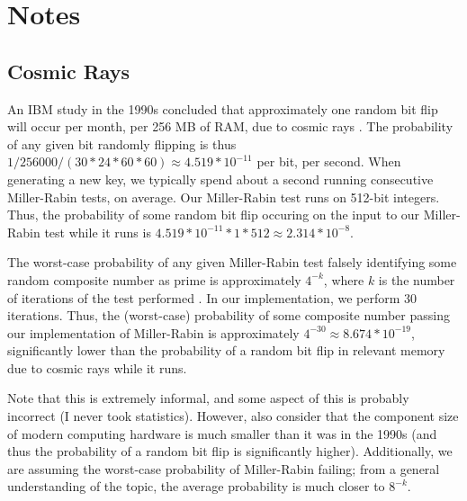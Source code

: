 \documentclass{article}
\begin{document}
\section{Notes}
\subsection{Cosmic Rays}
\label{sec:rays}
An IBM study in the 1990s concluded that approximately one random bit flip will occur per month, per 256 MB of RAM, due to cosmic rays \cite{cosmic}. The probability of any given bit randomly flipping is thus $1 / 256000 / (30 * 24 * 60 * 60) \approx 4.519 * 10^{-11}$ per bit, per second. When generating a new key, we typically spend about a second running consecutive Miller-Rabin tests, on average. Our Miller-Rabin test runs on 512-bit integers. Thus, the probability of some random bit flip occuring on the input to our Miller-Rabin test while it runs is $4.519 * 10^{-11} * 1 * 512 \approx 2.314 * 10^{-8}$.

The worst-case probability of any given Miller-Rabin test falsely identifying some random composite number as prime is approximately $4^{-k }$, where $k$ is the number of iterations of the test performed \cite{wolfram}. In our implementation, we perform 30 iterations. Thus, the (worst-case) probability of some composite number passing our implementation of Miller-Rabin is approximately $4^{-30} \approx 8.674 * 10^{-19}$, significantly lower than the probability of a random bit flip in relevant memory due to cosmic rays while it runs.

Note that this is extremely informal, and some aspect of this is probably incorrect (I never took statistics). However, also consider that the component size of modern computing hardware is much smaller than it was in the 1990s (and thus the probability of a random bit flip is significantly higher). Additionally, we are assuming the worst-case probability of Miller-Rabin failing; from a general understanding of the topic, the average probability is much closer to $8^{-k}$.


\clearpage
\end{document}

